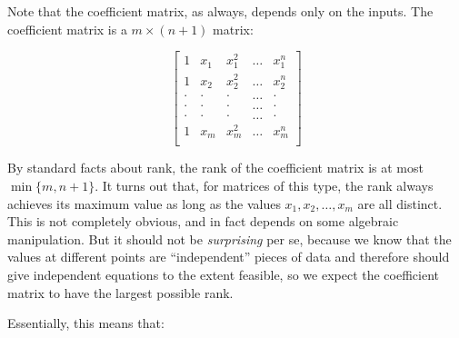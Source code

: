 \documentclass[10pt]{amsart}
\begin{document}
Note that the coefficient matrix, as always, depends only on the
inputs. The coefficient matrix is a $m \times (n + 1)$ matrix:

$$\left[\begin{matrix} 1 & x_1 & x_1^2 & \dots & x_1^n\\ 1 & x_2 & x_2^2 & \dots & x_2^n \\ \cdot & \cdot & \cdot & \dots & \cdot \\ \cdot & \cdot & \cdot & \dots & \cdot \\ \cdot & \cdot & \cdot & \dots & \cdot \\  1 & x_m & x_m^2 & \dots & x_m^n \\\end{matrix}\right]$$

By standard facts about rank, the rank of the coefficient matrix is
at most $\min \{ m, n + 1 \}$. It turns out that, for matrices of this
type, the rank always achieves its maximum value as long as the values
$x_1,x_2,\dots,x_m$ are all distinct. This is not completely obvious,
and in fact depends on some algebraic manipulation. But it should not
be {\em surprising} per se, because we know that the values at
different points are ``independent'' pieces of data and therefore
should give independent equations to the extent feasible, so we expect
the coefficient matrix to have the largest possible rank.

Essentially, this means that:
\end{document}
